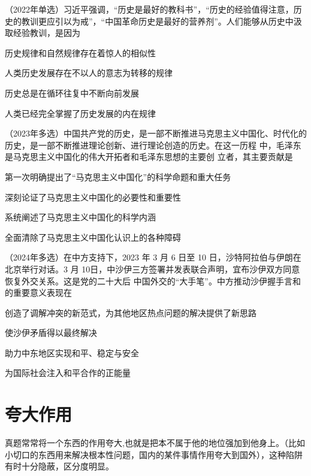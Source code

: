 \documentclass[lang=cn,newtx,10pt,scheme=chinese,pad,twocol]{zznote}
\begin{document}
\begin{example}
	（2022年单选）习近平强调，“历史是最好的教科书”，“历史的经验值得注意，历史的教训更应引以为戒”，“中国革命历史是最好的营养剂”。人们能够从历史中汲取经验教训，是因为
	\begin{choice}
		\item 历史规律和自然规律存在着惊人的相似性
		\item 人类历史发展存在不以人的意志为转移的规律
		\item 历史总是在循环往复中不断向前发展
		\item 人类已经完全掌握了历史发展的内在规律
	\end{choice}
\end{example}
\begin{example} （2023年多选）中国共产党的历史，是一部不断推进马克思主义中国化、时代化的 历史，是一部不断推进理论创新、进行理论创造的历史。在这一历程  中，毛泽东是马克思主义中国化的伟大开拓者和毛泽东思想的主要创
	立者，其主要贡献是
	\begin{choice}
		\item 第一次明确提出了“马克思主义中国化”的科学命题和重大任务
		\item 深刻论证了马克思主义中国化的必要性和重要性
		\item 系统阐述了马克思主义中国化的科学内涵
		\item 全面清除了马克思主义中国化认识上的各种障碍
	\end{choice}
\end{example}

\begin{example} （2024年多选）在中方支持下，2023 年 3 月 6 日至 10 日，沙特阿拉伯与伊朗在北京举行对话。3 月 10日，中沙伊三方签署并发表联合声明，宜布沙伊双方同意恢复外交关系。这是党的二十大后 中国外交的“大手笔”。中方推动沙伊握手言和的重要意义表现在
	\begin{choice}
		\item 创造了调解冲突的新范式，为其他地区热点问题的解决提供了新思路
		\item 使沙伊矛盾得以最终解决
		\item 助力中东地区实现和平、稳定与安全
		\item 为国际社会注入和平合作的正能量
	\end{choice}
\end{example}



\section{夸大作用}
\begin{definition}
	真题常常将一个东西的作用夸大,也就是把本不属于他的地位强加到他身上。（比如小切口的东西用来解决根本性问题，国内的某件事情作用夸大到国外），这种陷阱有时十分隐蔽，区分度明显。
\end{definition}
\end{document}
